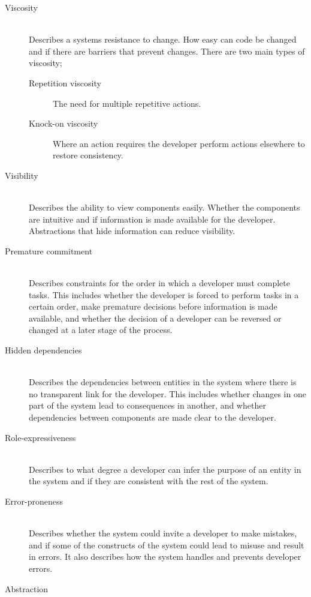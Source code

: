 \begin{description}
    \item[Viscosity]\hfill\\
    Describes a systems resistance to change. How easy can code be changed and if there are barriers that prevent changes. There are two main types of viscosity;
    \begin{description}
        \item[Repetition viscosity] The need for multiple repetitive actions.
        \item[Knock-on viscosity] Where an action requires the developer perform actions elsewhere to restore consistency. 
    \end{description}
    \item[Visibility]\hfill\\
    Describes the ability to view components easily. Whether the components are intuitive and if information is made available for the developer. Abstractions that hide information can reduce visibility.
    \item[Premature commitment]\hfill\\
    Describes constraints for the order in which a developer must complete tasks. This includes whether the developer is forced to perform tasks in a certain order, make premature decisions before information is made available, and whether the decision of a developer can be reversed or changed at a later stage of the process.
    \item[Hidden dependencies]\hfill\\ %
    Describes the dependencies between entities in the system where there is no transparent link for the developer. This includes whether changes in one part of the system lead to consequences in another, and whether dependencies between components are made clear to the developer.
    \item[Role-expressiveness]\hfill\\
    Describes to what degree a developer can infer the purpose of an entity in the system and if they are consistent with the rest of the system. 
    \item[Error-proneness]\hfill\\
    Describes whether the system could invite a developer to make mistakes, and if some of the constructs of the system could lead to misuse and result in errors. It also describes how the system handles and prevents developer errors.
    \item[Abstraction]\hfill\\

\end{description}
